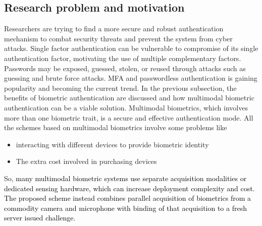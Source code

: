 \documentclass[runningheads]{llncs}
\begin{document}
\subsection{Research problem and motivation}
Researchers are trying to find a more secure and robust authentication mechanism to combat security threats and prevent the system from cyber attacks. Single factor authentication can be vulnerable to compromise of its single authentication factor, motivating the use of multiple complementary factors. Passwords may be exposed, guessed, stolen, or reused through attacks such as guessing and brute force attacks. MFA  and passwordless authentication is gaining popularity and becoming the current trend. In the previous subsection, the benefits of biometric authentication are discussed and how multimodal biometric authentication can be a viable solution. Multimodal biometrics, which involves more than one biometric trait, is a secure and effective authentication mode. All the schemes based on multimodal biometrics involve some problems like
\begin{itemize}
\item interacting with different devices to provide biometric identity
\item The extra cost involved in purchasing devices
\end{itemize}
So, \textcolor{black}{many multimodal biometric systems use separate acquisition modalities or dedicated sensing hardware, which can increase deployment complexity and cost. The proposed scheme instead combines parallel acquisition of biometrics from a commodity camera and microphone with binding of that acquisition to a fresh server issued challenge}.
\end{document}
